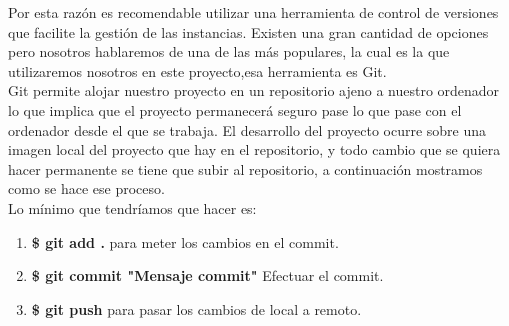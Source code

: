 \documentclass[12pt,a4paper]{article}
\begin{document}
	Por esta razón es recomendable utilizar una herramienta de control de versiones que facilite la gestión de las instancias. Existen una gran cantidad de opciones pero nosotros hablaremos de una de las más populares, la cual es la que utilizaremos nosotros en este proyecto,esa herramienta es Git.\\
	Git permite alojar nuestro proyecto en un repositorio ajeno a nuestro ordenador lo que implica que el proyecto permanecerá seguro pase lo que pase con el ordenador desde el que se trabaja. El desarrollo del proyecto ocurre sobre una imagen local del proyecto que hay en el repositorio, y todo cambio que se quiera hacer permanente se tiene que subir al repositorio, a continuación mostramos como se hace ese proceso.\\
	Lo mínimo que tendríamos que hacer es:\\
	\begin{enumerate}
	\item \textbf{\$ git add .} para meter los cambios en el commit.\\
	\item \textbf{\$ git commit "Mensaje commit"} Efectuar el commit.\\
	\item \textbf{\$ git push} para pasar los cambios de local a remoto.\\
	\end{enumerate}
	
\end{document}
